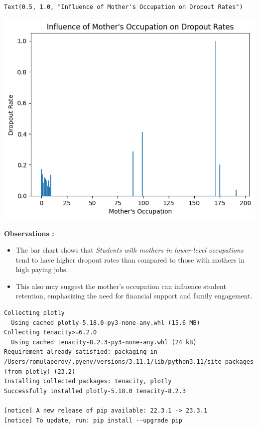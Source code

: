\documentclass[
  letterpaper,
  DIV=11,
  numbers=noendperiod]{scrartcl}
\begin{document}
\begin{verbatim}
Text(0.5, 1.0, "Influence of Mother's Occupation on Dropout Rates")
\end{verbatim}

\includegraphics{report_AzadhdhinNedalYunisAlFraijat_files/figure-pdf/cell-24-output-2.png}

\textbf{Observations :}

\begin{itemize}
\item
  The bar chart shows that \emph{Students with mothers in lower-level
  occupations} tend to have higher dropout rates than compared to those
  with mothers in high paying jobs.
\item
  This also may suggest the mother's occupation can influence student
  retention, emphasizing the need for financial support and family
  engagement.
\end{itemize}

\begin{verbatim}
Collecting plotly
  Using cached plotly-5.18.0-py3-none-any.whl (15.6 MB)
Collecting tenacity>=6.2.0
  Using cached tenacity-8.2.3-py3-none-any.whl (24 kB)
Requirement already satisfied: packaging in /Users/romulaperov/.pyenv/versions/3.11.1/lib/python3.11/site-packages (from plotly) (23.2)
Installing collected packages: tenacity, plotly
Successfully installed plotly-5.18.0 tenacity-8.2.3

[notice] A new release of pip available: 22.3.1 -> 23.3.1
[notice] To update, run: pip install --upgrade pip
\end{verbatim}
\end{document}
